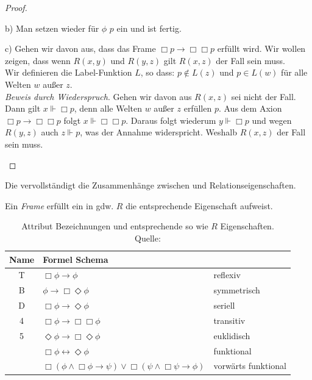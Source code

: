 \begin{proof}
\begin{enumerate}
		b) Man setzen wieder für $\phi$ $p$ ein und ist fertig.
		
		c) Gehen wir davon aus, dass das Frame $\Box p \rightarrow \Box \Box p$ erfüllt wird.
		Wir wollen zeigen, dass wenn $R(x,y)$ und $R(y,z)$ gilt $R(x,z)$ der Fall sein muss.\\
		Wir definieren die Label-Funktion $L$, so dass: $p \notin L(z)$ und $p \in L(w)$ für alle Welten $w$ außer $z$.\\
		\emph{Beweis durch Wiederspruch}. Gehen wir davon aus $R(x,z)$ sei nicht der Fall.
		Dann gilt $x \Vdash \Box p$, denn alle Welten $w$ außer $z$ erfüllen $p$.
		Aus dem Axion $\Box p \rightarrow \Box \Box p$ folgt $x \Vdash \Box \Box p$. 
		Daraus folgt wiederum $y \Vdash \Box p$ und wegen $R(y,z)$ auch $z \Vdash p$, was der Annahme widerspricht.
		Weshalb $R(x,z)$ der Fall sein muss.
	\end{enumerate}
\end{proof}

Die  vervollständigt die Zusammenhänge zwischen \formelSchemata und Relationseigenschaften.

\begin{theorem}
	\label{theo:aehnlichkeitstheorie}
	Ein \emph{Frame} \FrameDef erfüllt ein \formelSchema in  gdw. $R$ die entsprechende Eigenschaft aufweist. 
\end{theorem}

\begin{table}[h!]
	\centering
	\begin{tabular}{cll}
	\hline
	\hline
	Name & Formel Schema\\
	\hline
	T & $\Box \phi \rightarrow \phi$									&	reflexiv\\
	B & $\phi \rightarrow \Box \Diamond\phi$					& symmetrisch\\
	D & $\Box \phi \rightarrow \Diamond \phi$					& seriell\\
	4 & $\Box \phi \rightarrow \Box \Box \phi$				& transitiv\\
	5 & $\Diamond \phi \rightarrow \Box \Diamond \phi$& euklidisch\\
	  & $\Box \phi \leftrightarrow \Diamond \phi$			& funktional\\
	  & $\Box(\phi \wedge \Box \phi \rightarrow \psi) \vee \Box(\psi \wedge \Box \psi \rightarrow \phi)$& vorwärts funktional\\
	\hline
	\end{tabular}\\
	\caption{Attribut Bezeichnungen und entsprechende \formelSchemata so wie $R$ Eigenschaften.\\Quelle: \citeHuth[S.325]}
	\label{tab:attributesIncludingR}
\end{table}






